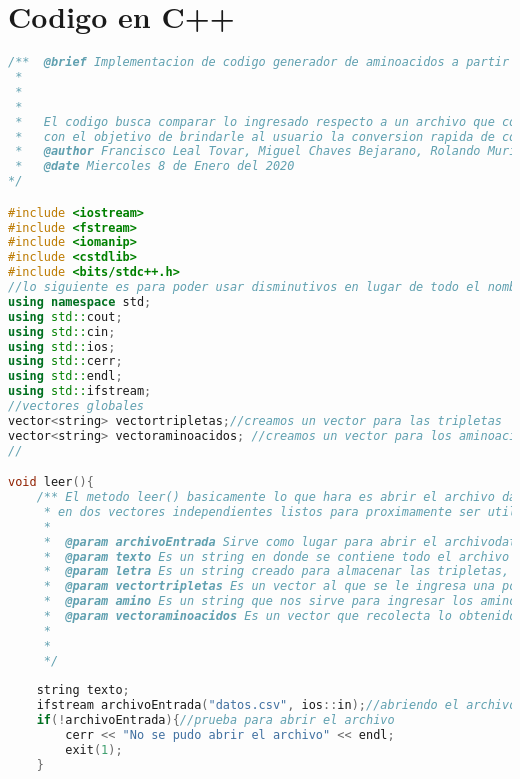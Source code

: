 \documentclass[12pt,letterpaper]{report}
\begin{document}
\section{Codigo en C++}
\begin{lstlisting}[language=c++]
/**  @brief Implementacion de codigo generador de aminoacidos a partir de codones de codigo genetico (ARN).
 * 
 * 
 * 
 *   El codigo busca comparar lo ingresado respecto a un archivo que contiene las asociaciones de tripletas a aminoacido
 *   con el objetivo de brindarle al usuario la conversion rapida de codones de codigo genetico al aminoacido.
 *   @author Francisco Leal Tovar, Miguel Chaves Bejarano, Rolando Murillo Pérez
 *   @date Miercoles 8 de Enero del 2020
*/

#include <iostream>
#include <fstream>
#include <iomanip>
#include <cstdlib>
#include <bits/stdc++.h> 
//lo siguiente es para poder usar disminutivos en lugar de todo el nombre
using namespace std;
using std::cout;
using std::cin;
using std::ios;
using std::cerr;
using std::endl;
using std::ifstream;
//vectores globales
vector<string> vectortripletas;//creamos un vector para las tripletas
vector<string> vectoraminoacidos; //creamos un vector para los aminoacidos
//

void leer(){
	/** El metodo leer() basicamente lo que hara es abrir el archivo datos.csv con la finalidad de poder obtener las dos columnas
	 * en dos vectores independientes listos para proximamente ser utilizados para la comparacion.
	 * 
	 *  @param archivoEntrada Sirve como lugar para abrir el archivodatos.csv
	 *  @param texto Es un string en donde se contiene todo el archivo datos.csv, pero no en el orden deseado
	 *  @param letra Es un string creado para almacenar las tripletas, se le reescribe para almacenar la siguiente tripleta
	 *  @param vectortripletas Es un vector al que se le ingresa una por una cada tripleta, contiene todas las 64 tripletas del archivo de la primera columna.
	 *  @param amino Es un string que nos sirve para ingresar los aminoacidos, se le reescribe para almacenar el siguiente aminoacido
	 *  @param vectoraminoacidos Es un vector que recolecta lo obtenido en la variable amino, resultando finalmente por tener en sus casillas todas los 64 aminoacidos asociables en el mismo orden que en el vectortripletas
	 * 
	 * 
	 */
	
	string texto;
	ifstream archivoEntrada("datos.csv", ios::in);//abriendo el archivo le damos "archivoEntrada" como nombre
	if(!archivoEntrada){//prueba para abrir el archivo
		cerr << "No se pudo abrir el archivo" << endl;
		exit(1);
	}


\end{lstlisting}
\end{document}
